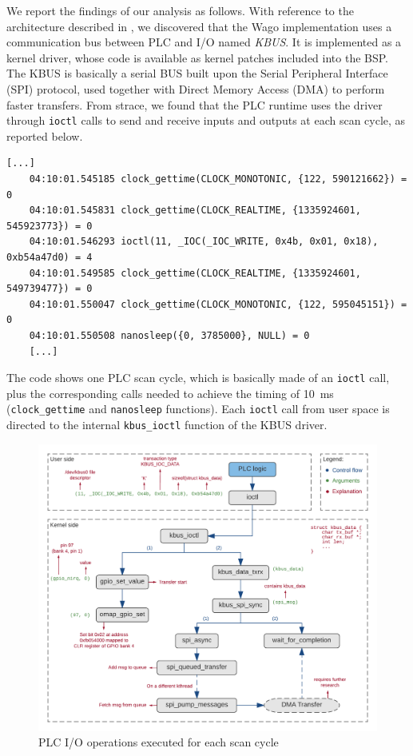 We report the findings of our analysis as follows. With reference to the architecture described in , we discovered that the Wago implementation
uses a communication bus between PLC and I/O named \emph{KBUS}. It is implemented as a kernel driver, whose code is available as kernel patches included into the BSP.
The KBUS is basically a serial BUS built upon the Serial Peripheral Interface (SPI) protocol, used together with Direct Memory Access (DMA) to perform faster transfers.
From strace, we found that the PLC runtime uses the driver through \verb|ioctl| calls to send and receive inputs and outputs at each scan cycle, as reported below.
\begin{Verbatim}[fontsize=\small]
	[...]
	04:10:01.545185 clock_gettime(CLOCK_MONOTONIC, {122, 590121662}) = 0
	04:10:01.545831 clock_gettime(CLOCK_REALTIME, {1335924601, 545923773}) = 0
	04:10:01.546293 ioctl(11, _IOC(_IOC_WRITE, 0x4b, 0x01, 0x18), 0xb54a47d0) = 4
	04:10:01.549585 clock_gettime(CLOCK_REALTIME, {1335924601, 549739477}) = 0
	04:10:01.550047 clock_gettime(CLOCK_MONOTONIC, {122, 595045151}) = 0
	04:10:01.550508 nanosleep({0, 3785000}, NULL) = 0
	[...]
\end{Verbatim}
The code shows one PLC scan cycle, which is basically made of an \verb|ioctl| call, plus the corresponding calls needed to achieve the timing
of \SI{10}{ms} (\verb|clock_gettime| and \verb|nanosleep| functions).
Each \verb|ioctl| call from user space is directed to the internal \verb|kbus_ioctl| function of the KBUS driver.
\begin{figure}[h]
\centerline{\includegraphics[width=\textwidth]{res/plc_io}}
\caption{PLC I/O operations executed for each scan cycle \label{fig:plc_io}}
\end{figure}
